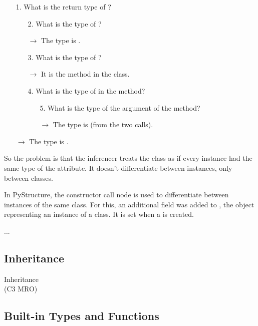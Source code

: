 \documentclass[12pt,halfparskip,DIV11,BCOR10mm]{scrreprt}
\begin{document}
\begin{enumerate}
	\item[1.] What is the return type of ?
	\begin{enumerate}
		\item[2.] What is the type of ?
		\item[] $\rightarrow$ The type is .
		\item[3.] What is the type of ?
		\item[] $\rightarrow$ It is the  method in the  class.
		\item[4.] What is the type of  in the  method?
		\begin{enumerate}
			\item [5.] What is the type of the  argument of the  method?
			\item [] $\rightarrow$ The type is  (from the two  calls).
		\end{enumerate}
	\end{enumerate}
	\item [] $\rightarrow$ The type is .
\end{enumerate}

So the problem is that the inferencer treats the  class as if every instance had the same type of the  attribute. It doesn't differentiate between instances, only between classes.

In PyStructure, the constructor call node is used to differentiate between instances of the same class. For this, an additional field  was added to , the object representing an instance of a class. It is set when a  is created.
 
... \cite{ddp}


\subsection{Inheritance}


Inheritance\\
 (C3 MRO)

\subsection{Built-in Types and Functions}
\end{document}
